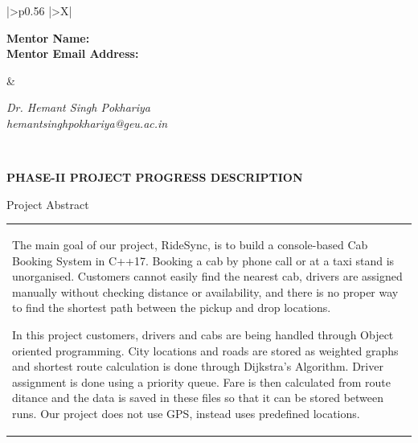 \documentclass[12pt,a4paper]{article}
\newcommand{\sectiontitle}[1]{%
    {\color{GEUBlue}
    \fontsize{18}{22}\selectfont #1}
}
\newcommand{\answerbox}[2]{%
    \begin{tabularx}{\textwidth}{
        |>{\RaggedRight\arraybackslash}X|}
        \hline
        \parbox[t][#1][t]{\dimexpr\linewidth-12pt\relax}{
            \vspace{5pt}
            \fontsize{11}{13}\selectfont #2
        }\\
        \hline
    \end{tabularx}
}
\begin{document}
\noindent
\begin{tabularx}{\textwidth}{
|>{\RaggedRight\arraybackslash}p{0.56\textwidth}
|>{\RaggedRight\arraybackslash}X|
}
\hline

\begin{minipage}[t]{\linewidth}
\vspace{2mm}
\textbf{Mentor Name:}\\[-1mm]
\textbf{Mentor Email Address:}
\vspace{2mm}
\end{minipage}
&
\begin{minipage}[t]{\linewidth}
\vspace{2mm}
\textit{Dr. Hemant Singh Pokhariya}\\
\textit{hemantsinghpokhariya@geu.ac.in}
\vspace{2mm}
\end{minipage}
\\
\hline

\end{tabularx}

\newpage


\vspace*{0.15cm}

\noindent
\colorbox{GEUBannerBlue}{%
\parbox{\dimexpr\textwidth-2\fboxsep\relax}{
    \vspace{0.18cm}
    {\color{GEUYellow}
    \fontsize{17}{21}\selectfont
    \bfseries
    PHASE-II PROJECT PROGRESS DESCRIPTION}
    \vspace{0.18cm}
}}

\vspace{0.70cm}

\sectiontitle{Project Abstract}

\vspace{0.05cm}

\vspace{0.12cm}

\answerbox{4.60cm}{
The main goal of our project, RideSync, is to build a console-based Cab Booking System in C++17. Booking a cab by phone call or at a taxi stand is unorganised. Customers cannot easily find the nearest cab, drivers are assigned manually without checking distance or availability, and there is no proper way to find the shortest path between the pickup and drop locations.

In this project customers, drivers and cabs are being handled through Object oriented programming. City locations and roads are stored as weighted graphs and shortest route calculation is done through Dijkstra's Algorithm. Driver assignment is done using a priority queue. Fare is then calculated from route ditance and the data is saved in these files so that it can be stored between runs. Our project does not use GPS, instead uses predefined locations.
}
\end{document}
